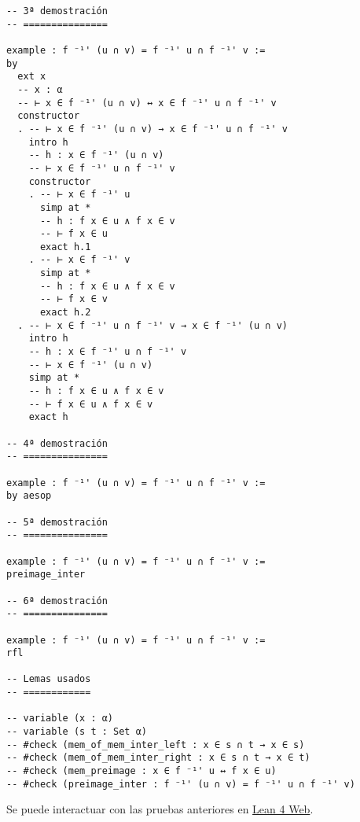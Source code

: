 \begin{verbatim}
-- 3ª demostración
-- ===============

example : f ⁻¹' (u ∩ v) = f ⁻¹' u ∩ f ⁻¹' v :=
by
  ext x
  -- x : α
  -- ⊢ x ∈ f ⁻¹' (u ∩ v) ↔ x ∈ f ⁻¹' u ∩ f ⁻¹' v
  constructor
  . -- ⊢ x ∈ f ⁻¹' (u ∩ v) → x ∈ f ⁻¹' u ∩ f ⁻¹' v
    intro h
    -- h : x ∈ f ⁻¹' (u ∩ v)
    -- ⊢ x ∈ f ⁻¹' u ∩ f ⁻¹' v
    constructor
    . -- ⊢ x ∈ f ⁻¹' u
      simp at *
      -- h : f x ∈ u ∧ f x ∈ v
      -- ⊢ f x ∈ u
      exact h.1
    . -- ⊢ x ∈ f ⁻¹' v
      simp at *
      -- h : f x ∈ u ∧ f x ∈ v
      -- ⊢ f x ∈ v
      exact h.2
  . -- ⊢ x ∈ f ⁻¹' u ∩ f ⁻¹' v → x ∈ f ⁻¹' (u ∩ v)
    intro h
    -- h : x ∈ f ⁻¹' u ∩ f ⁻¹' v
    -- ⊢ x ∈ f ⁻¹' (u ∩ v)
    simp at *
    -- h : f x ∈ u ∧ f x ∈ v
    -- ⊢ f x ∈ u ∧ f x ∈ v
    exact h

-- 4ª demostración
-- ===============

example : f ⁻¹' (u ∩ v) = f ⁻¹' u ∩ f ⁻¹' v :=
by aesop

-- 5ª demostración
-- ===============

example : f ⁻¹' (u ∩ v) = f ⁻¹' u ∩ f ⁻¹' v :=
preimage_inter

-- 6ª demostración
-- ===============

example : f ⁻¹' (u ∩ v) = f ⁻¹' u ∩ f ⁻¹' v :=
rfl

-- Lemas usados
-- ============

-- variable (x : α)
-- variable (s t : Set α)
-- #check (mem_of_mem_inter_left : x ∈ s ∩ t → x ∈ s)
-- #check (mem_of_mem_inter_right : x ∈ s ∩ t → x ∈ t)
-- #check (mem_preimage : x ∈ f ⁻¹' u ↔ f x ∈ u)
-- #check (preimage_inter : f ⁻¹' (u ∩ v) = f ⁻¹' u ∩ f ⁻¹' v)
\end{verbatim}
Se puede interactuar con las pruebas anteriores en \href{https://lean.math.hhu.de/\#url=https://raw.githubusercontent.com/jaalonso/Calculemus2/main/src/Imagen\_inversa\_de\_la\_interseccion.lean}{Lean 4 Web}.

